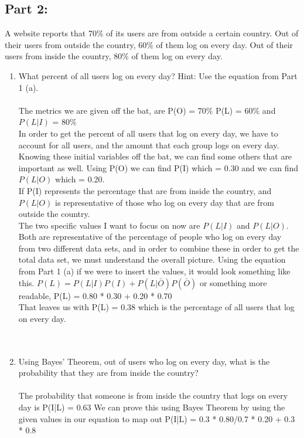  \subsection*{Part 2:}
 A website reports that 70\% of its users are from outside a certain country. Out of their users from outside the country, 60\% of them log on every day. Out of their users from inside the country, 80\% of them log on every day.
 \\
 \begin{enumerate}[label=(\alph*)]
 \item What percent of all users log on every day? Hint: Use the equation from Part 1 (a).
 \\\\
The metrics we are given off the bat, are P(O) = 70$\%$ P(L) = 60$\%$ and $P(L|I)$ = 80$\%$ \\

In order to get the percent of all users that log on every day, we have to account for all users, and the amount that each group logs on every day. Knowing these initial variables off the bat, we can find some others that are important as well. Using P(O) we can find P(I) which = 0.30 and we can find $P(L|O)$ which = 0.20. \\

If P(I) represents the percentage that are from inside the country, and $P(L|O)$ is representative of those who log on every day that are from outside the country. \\

The two specific values I want to focus on now are $P(L|I)$ and $P(L|O)$. Both are representative of the percentage of people who log on every day from two different data sets, and in order to combine these in order to get the total data set, we must understand the overall picture. Using the equation from Part 1 (a) if we were to insert the values, it would look something like this. $P(L) = P(L|I)P(I) + P(L|\bar{O})P(\bar{O})$ or something more readable, P(L) = 0.80 * 0.30 + 0.20 * 0.70 \\

That leaves us with P(L) = 0.38 which is the percentage of all users that log on every day.
 \\
 
 \\\\
 \item Using Bayes’ Theorem, out of users who log on every day, what is the probability that they are from inside the country?
 \\\\
The probability that someone is from inside the country that logs on every day is P(I|L) = 0.63
We can prove this using Bayes Theorem by using the given values in our equation to map out P(I|L) = 0.3 * 0.80/0.7 * 0.20 + 0.3 * 0.8

 \\\\
 \end{enumerate}
\newpage

